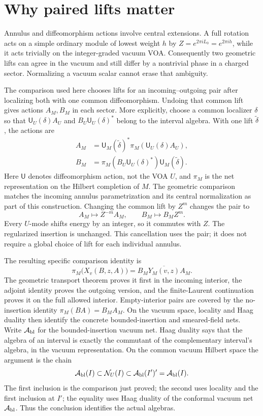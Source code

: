 \section{Why paired lifts matter}

Annulus and diffeomorphism actions involve central extensions.
A full rotation acts on a simple ordinary module of lowest weight $h$ by
$Z=e^{2\pi iL_0}=e^{2\pi ih}$, while it acts trivially on the
integer-graded vacuum VOA. Consequently two geometric lifts can
agree in the vacuum and still differ by a nontrivial phase in a
charged sector. Normalizing a vacuum scalar cannot erase that
ambiguity.

The comparison used here chooses lifts for an incoming--outgoing
pair after localizing both with one common diffeomorphism. Undoing
that common lift gives actions $A_M,B_M$ in each sector.
More explicitly, choose a common localizer $\delta$ so that
$\mathsf U_U(\delta)A_U$ and $B_U\mathsf U_U(\delta)^*$
belong to the interval algebra. With one lift $\widetilde\delta$,
the actions are
\begin{align*}
 A_M&=\mathsf U_M(\widetilde\delta)^*
       \pi_M\!\left(\mathsf U_U(\delta)A_U\right),\\
 B_M&=\pi_M\!\left(B_U\mathsf U_U(\delta)^*\right)
       \mathsf U_M(\widetilde\delta).
\end{align*}
Here $\mathsf U$ denotes diffeomorphism action, not the VOA $U$, and
$\pi_M$ is the net representation on the Hilbert completion of $M$.
The geometric comparison matches the incoming annulus
parametrization and its central normalization as part of this
construction. Changing
the common lift by $Z^m$ changes the pair to
\[
 A_M\longmapsto Z^{-m}A_M,\qquad
 B_M\longmapsto B_MZ^m.
\]
Every $U$-mode shifts energy by an integer, so it commutes with
$Z$. The regularized insertion is unchanged. This cancellation
uses the pair; it does not require a global choice of lift for
each individual annulus.

The resulting specific comparison identity is
\begin{equation}
 \pi_M\bigl(X_v(B,z,A)\bigr)
   =\overline{B_MY_M(v,z)A_M}.
 \label{eq:unitarity-pair-comparison}
\end{equation}
The geometric transport theorem proves it first in the incoming
interior, the adjoint identity proves the outgoing version, and
the finite-Laurent continuation proves it on the full allowed
interior. Empty-interior pairs are covered by the no-insertion
identity $\pi_M(BA)=B_MA_M$. On the vacuum space, locality and
Haag duality then identify the concrete bounded-insertion and
smeared-field nets. Write $\mathcal A_{\rm bl}$ for the
bounded-insertion vacuum net. Haag duality says that the algebra of an
interval is exactly the commutant of the complementary interval's
algebra, in the vacuum representation. On the common vacuum Hilbert space the
argument is the chain
\[
 \mathcal A_{\rm bl}(I)\subset\mathcal N_U(I)
 \subset\mathcal A_{\rm bl}(I')'
 =\mathcal A_{\rm bl}(I).
\]
The first inclusion is the comparison just proved; the second
uses locality and the first inclusion at $I'$; the equality uses
Haag duality of the conformal vacuum net $\mathcal A_{\rm bl}$.
Thus the conclusion identifies the actual algebras.

